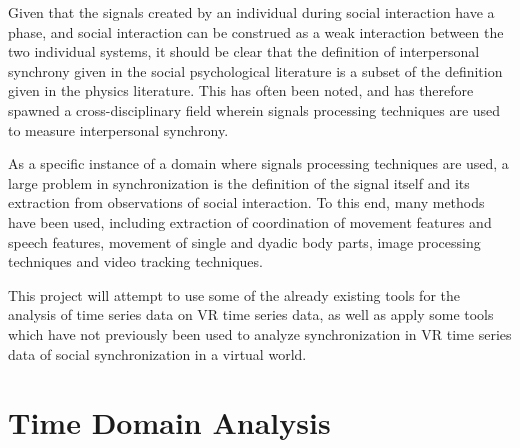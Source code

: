\documentclass[12pt]{article}
\begin{document}
Given that the signals created by an individual during social interaction have a phase, and social interaction can be construed as a weak interaction between the two individual systems, it should be clear that the definition of interpersonal synchrony given in the social psychological literature is a subset of the definition given in the physics literature. This has often been noted, and has therefore spawned a cross-disciplinary field wherein signals processing techniques are used to measure interpersonal synchrony. %

As a specific instance of a domain where signals processing techniques are used, a large problem in synchronization is the definition of the signal itself and its extraction from observations of social interaction. To this end, many methods have been used, including extraction of coordination of movement features and speech features, movement of single and dyadic body parts, image processing techniques and video tracking techniques. %





This project will attempt to use some of the already existing tools for the analysis of time series data on VR time series data, as well as apply some tools which have not previously been used to analyze synchronization in VR time series data of social synchronization in a virtual world.

\section{Time Domain Analysis}

\end{document}
